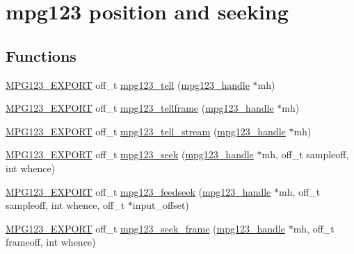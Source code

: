 \hypertarget{group__mpg123__seek}{}\section{mpg123 position and seeking}
\label{group__mpg123__seek}
\subsection*{Functions}
\begin{DoxyCompactItemize}
\item 
\mbox{\hyperlink{mpg123_8h_a2ba98cfba3f760879df70e755b2a61cc}{M\+P\+G123\+\_\+\+E\+X\+P\+O\+RT}} off\+\_\+t \mbox{\hyperlink{group__mpg123__seek_gaad30e14c278dde500e609af2971d7b44}{mpg123\+\_\+tell}} (\mbox{\hyperlink{group__mpg123__init_ga6728e2839a395f3a07d4514da659faca}{mpg123\+\_\+handle}} $\ast$mh)
\item 
\mbox{\hyperlink{mpg123_8h_a2ba98cfba3f760879df70e755b2a61cc}{M\+P\+G123\+\_\+\+E\+X\+P\+O\+RT}} off\+\_\+t \mbox{\hyperlink{group__mpg123__seek_gaab81ee3527294d01e2c10a10e91022ee}{mpg123\+\_\+tellframe}} (\mbox{\hyperlink{group__mpg123__init_ga6728e2839a395f3a07d4514da659faca}{mpg123\+\_\+handle}} $\ast$mh)
\item 
\mbox{\hyperlink{mpg123_8h_a2ba98cfba3f760879df70e755b2a61cc}{M\+P\+G123\+\_\+\+E\+X\+P\+O\+RT}} off\+\_\+t \mbox{\hyperlink{group__mpg123__seek_ga385bcc9fd3cec22289410828eac3938b}{mpg123\+\_\+tell\+\_\+stream}} (\mbox{\hyperlink{group__mpg123__init_ga6728e2839a395f3a07d4514da659faca}{mpg123\+\_\+handle}} $\ast$mh)
\item 
\mbox{\hyperlink{mpg123_8h_a2ba98cfba3f760879df70e755b2a61cc}{M\+P\+G123\+\_\+\+E\+X\+P\+O\+RT}} off\+\_\+t \mbox{\hyperlink{group__mpg123__seek_gabf7633e5765e35933e264f175f5fcf8c}{mpg123\+\_\+seek}} (\mbox{\hyperlink{group__mpg123__init_ga6728e2839a395f3a07d4514da659faca}{mpg123\+\_\+handle}} $\ast$mh, off\+\_\+t sampleoff, int whence)
\item 
\mbox{\hyperlink{mpg123_8h_a2ba98cfba3f760879df70e755b2a61cc}{M\+P\+G123\+\_\+\+E\+X\+P\+O\+RT}} off\+\_\+t \mbox{\hyperlink{group__mpg123__seek_gab0b0e6ed9e4ba14f1ca0c1dd83be6f57}{mpg123\+\_\+feedseek}} (\mbox{\hyperlink{group__mpg123__init_ga6728e2839a395f3a07d4514da659faca}{mpg123\+\_\+handle}} $\ast$mh, off\+\_\+t sampleoff, int whence, off\+\_\+t $\ast$input\+\_\+offset)
\item 
\mbox{\hyperlink{mpg123_8h_a2ba98cfba3f760879df70e755b2a61cc}{M\+P\+G123\+\_\+\+E\+X\+P\+O\+RT}} off\+\_\+t \mbox{\hyperlink{group__mpg123__seek_gada9748c253215a8669eab327dd00d447}{mpg123\+\_\+seek\+\_\+frame}} (\mbox{\hyperlink{group__mpg123__init_ga6728e2839a395f3a07d4514da659faca}{mpg123\+\_\+handle}} $\ast$mh, off\+\_\+t frameoff, int whence)

\end{DoxyCompactItemize}
